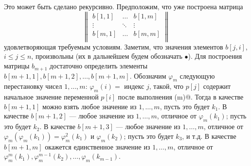 \documentclass[12pt,a4paper]{article}
\theoremstyle{plain}
\theoremstyle{definition}
\theoremstyle{remark}
\let\phi\varphi
\begin{document}
Это может быть сделано рекурсивно. Предположим, что уже построена матрица
\[ \begin{Vmatrix}
b[1,1] & \dots & b[1,m] \\
\vdots & \ddots & \vdots \\
b[m,1] & \dots & b[m,m] \\
\end{Vmatrix}
\]
удовлетворяющая требуемым условиям. Заметим, что значения элементов $b[j,i]$, $i\le j\le n$, произвольны (их в дальнейшем будем обозначать $\bullet$). Для построения матрицы $b_{m+1}$ достаточно определить элементы $b[m+1,1], b[m+1,2], \ldots, b[m+1,m]$. Обозначим $\phi_m$ следующую перестановку чисел $1,\ldots,m$: $\phi_m(i) = $ индекс $j$, такой, что $p[j]$ содержит начальное значение переменной $p[i]$ после выполнения \verb@PERM(m)@. Тогда в качестве $b[m+1,1]$ можно взять любое значение из $1,\ldots,m$, пусть это будет $k_1$. В качестве $b[m+1,2]$ --- любое значение из $1,\ldots,m$, отличное от $\phi_m(k_1)$; пусть это будет $k_2$. В качестве $b[m+1,3]$ --- любое значение из $1,\ldots,m$, отличное от $\phi_m(\phi_m(k_1)) = \phi_m^2(k_1)$ и $\phi_m(k_2)$; пусть это будет $k_3$, и т.д. В качестве $b[m+1,m]$ окажется единственное значение из $1,\ldots,m$, отличное от $\phi_m^m(k_1), \phi_m^{m-1}(k_2), \ldots, \phi_m(k_{m-1})$.
\end{document}
